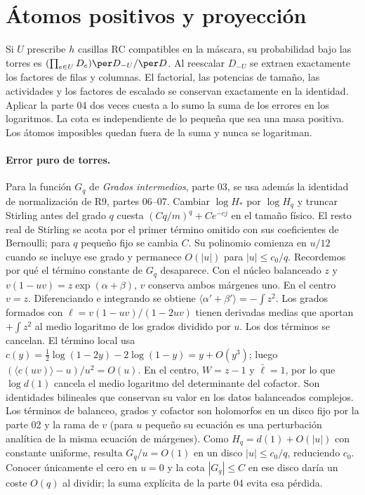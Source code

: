 \section{Átomos positivos y proyección}
Si $U$ prescribe $h$ casillas RC compatibles en la máscara, su probabilidad bajo
las torres es $(\prod_{e\in U}D_e)\per D_{-U}/\per D$. Al reescalar $D_{-U}$
se extraen exactamente los factores de filas y columnas. El factorial, las potencias
de tamaño, las actividades y los factores de escalado se conservan exactamente en
la identidad. Aplicar la parte 04 dos veces cuesta a lo sumo la suma de los errores
en los logaritmos. La cota es independiente de lo pequeña que sea una masa positiva.
Los átomos imposibles quedan fuera de la suma y nunca se logaritman.
\paragraph{Error puro de torres.}
Para la función $G_q$ de \emph{Grados intermedios}, parte 03, se usa además la
identidad de normalización de R9, partes 06--07. Cambiar $\log H_*$ por $\log H_q$ y
truncar Stirling antes del grado $q$ cuesta $(Cq/m)^q+Ce^{-cj}$ en el tamaño físico.
El resto real de Stirling se acota por el primer término omitido con sus coeficientes
de Bernoulli; para $q$ pequeño fijo se cambia $C$. Su polinomio comienza en $u/12$
cuando se incluye ese grado y permanece $O(|u|)$ para $|u|\le c_0/q$.
Recordemos por qué el término constante de $G_q$ desaparece. Con el núcleo balanceado $z$
y $v(1-uv)=z\exp(\alpha+\beta)$, $v$ conserva ambos márgenes uno.
En el centro $v=z$. Diferenciando e integrando se obtiene
$\langle\alpha'+\beta'\rangle=-\int z^2$. Los grados formados con
$\ell=v(1-uv)/(1-2uv)$ tienen derivadas medias que aportan $+\int z^2$
al medio logaritmo de los grados dividido por $u$. Los dos términos se cancelan.
El término local usa $c(y)=\frac12\log(1-2y)-2\log(1-y)=y+O(y^3)$; luego
$(\langle c(uv)\rangle-u)/u^2=O(u)$. En el centro, $W=z-1$ y $\bar\ell=1$,
por lo que $\log d(1)$ cancela el medio logaritmo del determinante del cofactor.
Son identidades bilineales que conservan su valor en los datos balanceados complejos.
Los términos de balanceo, grados y cofactor son holomorfos en un disco fijo por
la parte 02 y la rama de $v$ (para $u$ pequeño su ecuación es una perturbación
analítica de la misma ecuación de márgenes). Como $H_q=d(1)+O(|u|)$ con constante
uniforme, resulta $G_q/u=O(1)$ en un disco $|u|\le c_0/q$, reduciendo $c_0$.
Conocer únicamente el cero en $u=0$ y la cota $|G_q|\le C$ en ese disco daría
un coste $O(q)$ al dividir; la suma explícita de la parte 04 evita esa pérdida.
